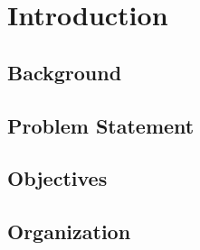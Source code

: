 \section{Introduction}

\subsection{Background}

\subsection{Problem Statement}

\subsection{Objectives}

\subsection{Organization}
